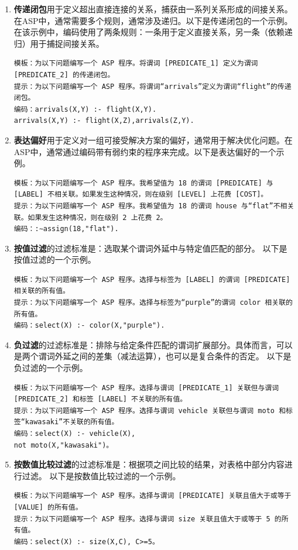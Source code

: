\begin{enumerate}[nosep]
\begin{lstlisting}
\end{lstlisting}
\item \textbf{传递闭包}用于定义超出直接连接的关系，捕获由一系列关系形成的间接关系。在ASP中，通常需要多个规则，通常涉及递归。以下是传递闭包的一个示例。
在该示例中，编码使用了两条规则：一条用于定义直接关系，另一条（依赖递归）用于捕捉间接关系。
\begin{lstlisting}
模板：为以下问题编写一个 ASP 程序。将谓词 [PREDICATE_1] 定义为谓词 [PREDICATE_2] 的传递闭包。
提示：为以下问题编写一个 ASP 程序。将谓词“arrivals”定义为谓词“flight”的传递闭包。
编码：arrivals(X,Y) :- flight(X,Y).
arrivals(X,Y) :- flight(X,Z),arrivals(Z,Y).
\end{lstlisting}
\item \textbf{表达偏好}用于定义对一组可接受解决方案的偏好，通常用于解决优化问题。在ASP中，通常通过编码带有弱约束的程序来完成。以下是表达偏好的一个示例。
\begin{lstlisting}
模板：为以下问题编写一个 ASP 程序。我希望值为 18 的谓词 [PREDICATE] 与 [LABEL] 不相关联。如果发生这种情况，则在级别 [LEVEL] 上花费 [COST]。
提示：为以下问题编写一个 ASP 程序。我希望值为 18 的谓词 house 与“flat”不相关联。如果发生这种情况，则在级别 2 上花费 2。
编码：:∼assign(18,"flat").
\end{lstlisting}
\item \textbf{按值过滤}的过滤标准是：选取某个谓词外延中与特定值匹配的部分。
以下是按值过滤的一个示例。
\begin{lstlisting}
模板：为以下问题编写一个 ASP 程序。选择与标签为 [LABEL] 的谓词 [PREDICATE] 相关联的所有值。
提示：为以下问题编写一个 ASP 程序。选择与标签为“purple”的谓词 color 相关联的所有值。
编码：select(X) :- color(X,"purple").
\end{lstlisting}
\item \textbf{负过滤}的过滤标准是：排除与给定条件匹配的谓词扩展部分。具体而言，可以是两个谓词外延之间的差集（减法运算），也可以是复合条件的否定。
以下是负过滤的一个示例。
\begin{lstlisting}
模板：为以下问题编写一个 ASP 程序。选择与谓词 [PREDICATE_1] 关联但与谓词 [PREDICATE_2] 和标签 [LABEL] 不关联的所有值。
提示：为以下问题编写一个 ASP 程序。选择与谓词 vehicle 关联但与谓词 moto 和标签“kawasaki”不关联的所有值。
编码：select(X) :- vehicle(X),
not moto(X,"kawasaki")。
\end{lstlisting}
\item \textbf{按数值比较过滤}的过滤标准是：根据项之间比较的结果，对表格中部分内容进行过滤。
以下是按数值比较过滤的一个示例。
\begin{lstlisting}
模板：为以下问题编写一个 ASP 程序。选择与谓词 [PREDICATE] 关联且值大于或等于 [VALUE] 的所有值。
提示：为以下问题编写一个 ASP 程序。选择与谓词 size 关联且值大于或等于 5 的所有值。
编码：select(X) :- size(X,C), C>=5。
\end{lstlisting}
\end{enumerate}

